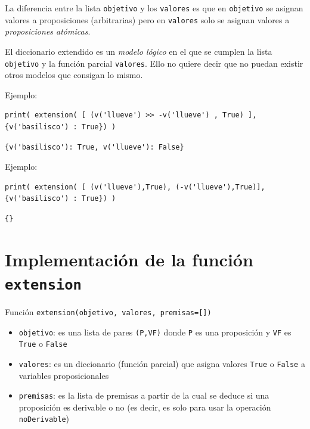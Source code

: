 \documentclass[10pt,a4paper]{report}
\begin{document}
La diferencia entre la lista \texttt{objetivo} y los \texttt{valores} es que en \texttt{objetivo} se asignan valores a proposiciones (arbitrarias) pero en \texttt{valores} solo se asignan valores a \emph{proposiciones atómicas}.

El diccionario extendido es un \emph{modelo lógico} en el que se cumplen la lista \texttt{objetivo} y la función parcial \texttt{valores}. 
Ello no quiere decir que no puedan existir otros modelos que consigan lo mismo.

Ejemplo:
\begin{verbatim}
print( extension( [ (v('llueve') >> -v('llueve') , True) ], {v('basilisco') : True}) )
\end{verbatim}

\label{}
\begin{verbatim}
{v('basilisco'): True, v('llueve'): False}
\end{verbatim}



Ejemplo:
\begin{verbatim}
print( extension( [ (v('llueve'),True), (-v('llueve'),True)], {v('basilisco') : True}) )
\end{verbatim}

\label{}
\begin{verbatim}
{}
\end{verbatim}
\section{Implementación de la función  \texttt{extension}}
\label{sec:orgc2e6e09}

Función \texttt{extension(objetivo, valores, premisas=[])}

\begin{itemize}
\item \texttt{objetivo}: es una lista de pares \texttt{(P,VF)} donde \texttt{P} es una proposición y \texttt{VF} es \texttt{True} o \texttt{False}

\item \texttt{valores}: es un diccionario (función parcial) que asigna valores \texttt{True} o \texttt{False} a variables proposicionales

\item \texttt{premisas}: es la lista de premisas a partir de la cual se deduce si una proposición es derivable o no (es decir, es solo para usar la operación \texttt{noDerivable})
\end{itemize}
\end{document}
